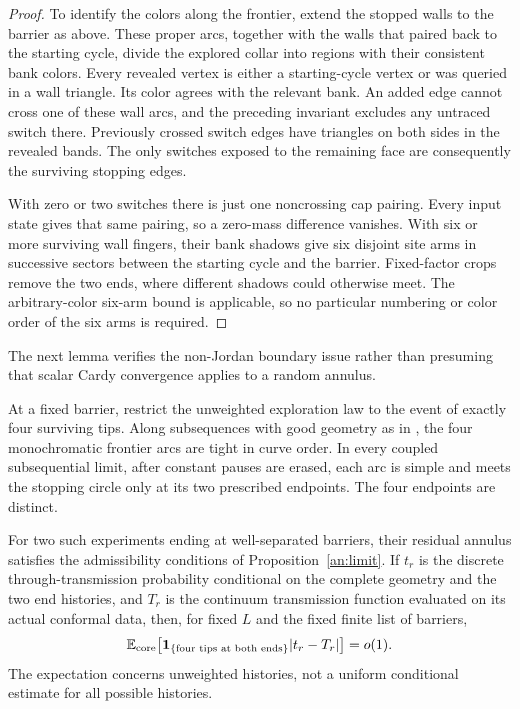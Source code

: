 \begin{proof}
To identify the colors along the frontier, extend the stopped walls
to the barrier as above.  These proper arcs, together with the walls
that paired back to the starting cycle, divide the explored collar
into regions with their consistent bank colors.  Every revealed vertex
is either a starting-cycle vertex or was queried in a wall triangle.
Its color agrees with the relevant bank.  An added edge cannot cross
one of these wall arcs, and the preceding invariant excludes any
untraced switch there.  Previously crossed switch edges have triangles on
both sides in the revealed bands.  The only switches exposed to the
remaining face are consequently the surviving stopping edges.

With zero or two switches there is just one noncrossing cap pairing.
Every input state gives that same pairing, so a zero-mass difference
vanishes.  With six or more surviving wall fingers, their bank shadows
give six disjoint site arms in successive sectors between the starting
cycle and the barrier.  Fixed-factor crops remove the two ends, where
different shadows could otherwise meet.  The arbitrary-color six-arm
bound is applicable, so no particular numbering or color order of the
six arms is required.
\end{proof}

The next lemma verifies the non-Jordan boundary issue rather than
presuming that scalar Cardy convergence applies to a random annulus.

\begin{lemma}
\label{tr:admissible}
At a fixed barrier, restrict the unweighted exploration law to the event
of exactly four surviving tips.  Along subsequences with good geometry
as in \cite[Section~2]{V}, the four monochromatic frontier arcs are tight
in curve order.  In every coupled subsequential limit, after constant
pauses are erased, each arc is simple and meets the stopping circle
only at its two prescribed endpoints.  The four endpoints are distinct.

For two such experiments ending at well-separated barriers, their
residual annulus satisfies the admissibility conditions of
Proposition~\ref{an:limit}.  If $t_r$ is the discrete
through-transmission probability conditional on the complete geometry
and the two end histories, and $T_r$
is the continuum transmission function evaluated on its actual
conformal data, then, for fixed $L$ and the fixed finite list of barriers,
\begin{equation}
       \mathbb E_{\mathrm{core}}\!\left[
          \boldsymbol 1_{\{\text{four tips at both ends}\}}
                              |t_r-T_r|\right]=o(1).
\label{tr:mean-limit}
\end{equation}
The expectation concerns unweighted histories, not a uniform conditional
estimate for all possible histories.
\end{lemma}

